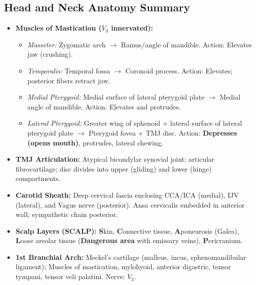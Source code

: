 \documentclass[11pt,a4paper]{article}
\begin{document}
\subsection{Head and Neck Anatomy Summary}
\begin{itemize}[leftmargin=*]
    \item \textbf{Muscles of Mastication ($V_3$ innervated):}
    \begin{itemize}
        \item \textit{Masseter:} Zygomatic arch $\rightarrow$ Ramus/angle of mandible. Action: Elevates jaw (crushing).
        \item \textit{Temporalis:} Temporal fossa $\rightarrow$ Coronoid process. Action: Elevates; posterior fibers retract jaw.
        \item \textit{Medial Pterygoid:} Medial surface of lateral pterygoid plate $\rightarrow$ Medial angle of mandible. Action: Elevates and protrudes.
        \item \textit{Lateral Pterygoid:} Greater wing of sphenoid + lateral surface of lateral pterygoid plate $\rightarrow$ Pterygoid fovea + TMJ disc. Action: \textbf{Depresses (opens mouth)}, protrudes, lateral chewing.
    \end{itemize}
    \item \textbf{TMJ Articulation:} Atypical bicondylar synovial joint; articular fibrocartilage; disc divides into upper (gliding) and lower (hinge) compartments.
    \item \textbf{Carotid Sheath:} Deep cervical fascia enclosing CCA/ICA (medial), IJV (lateral), and Vagus nerve (posterior). Ansa cervicalis embedded in anterior wall; sympathetic chain posterior.
    \item \textbf{Scalp Layers (SCALP):} \textbf{S}kin, \textbf{C}onnective tissue, \textbf{A}poneurosis (Galea), \textbf{L}oose areolar tissue (\textbf{Dangerous area} with emissary veins), \textbf{P}ericranium.
    \item \textbf{1st Branchial Arch:} Meckel's cartilage (malleus, incus, sphenomandibular ligament); Muscles of mastication, mylohyoid, anterior digastric, tensor tympani, tensor veli palatini. Nerve: $V_3$.
\end{itemize}
\end{document}
